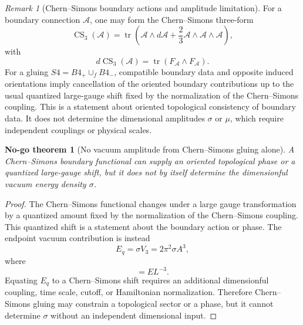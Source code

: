 \documentclass[11pt,a4paper]{article}
\def\Bfour{B4}%
\def\Sfour{S4}%
\def\dd{d}%
\numberwithin{equation}{section}
\newtheorem{nogotheorem}[criterion]{No-go theorem}
\theoremstyle{remark}
\newtheorem{remark}[criterion]{Remark}
\newcommand{\Sfour}{S^4}
\newcommand{\Bfour}{B^4}
\newcommand{\dd}{\mathrm{d}}
\begin{document}
\begin{remark}[Chern--Simons boundary actions and amplitude limitation]
For a boundary connection \(\mathcal{A}\), one may form the Chern--Simons three-form \cite{ChernSimons1974}
\begin{equation}
\operatorname{CS}_3(\mathcal{A})=
\operatorname{tr}\left(\mathcal{A}\wedge\dd\mathcal{A}
+\frac{2}{3}\mathcal{A}\wedge\mathcal{A}\wedge\mathcal{A}\right),
\end{equation}
with
\begin{equation}
\dd\operatorname{CS}_3(\mathcal{A})=\operatorname{tr}(F_{\mathcal{A}}\wedge F_{\mathcal{A}}).
\end{equation}
For a gluing \(\Sfour=\Bfour_+\cup_f\Bfour_-\), compatible boundary data and opposite induced orientations imply cancellation of the oriented boundary contributions up to the usual quantized large-gauge shift fixed by the normalization of the Chern--Simons coupling. This is a statement about oriented topological consistency of boundary data. It does not determine the dimensional amplitudes \(\sigma\) or \(\mu\), which require independent couplings or physical scales.
\end{remark}


\begin{nogotheorem}[No vacuum amplitude from Chern--Simons gluing alone]
A Chern--Simons boundary functional can supply an oriented topological phase or a quantized large-gauge shift, but it does not by itself determine the dimensionful vacuum energy density \(\sigma\).
\end{nogotheorem}
\begin{proof}
The Chern--Simons functional changes under a large gauge transformation by a quantized amount fixed by the normalization of the Chern--Simons coupling. This quantized shift is a statement about the boundary action or phase. The endpoint vacuum contribution is instead
\begin{equation}
E_q=\sigma V_3=2\pi^2\sigma A^3,
\end{equation}
where
\begin{equation}
[\sigma]=EL^{-3}.
\end{equation}
Equating \(E_q\) to a Chern--Simons shift requires an additional dimensionful coupling, time scale, cutoff, or Hamiltonian normalization. Therefore Chern--Simons gluing may constrain a topological sector or a phase, but it cannot determine \(\sigma\) without an independent dimensional input.
\end{proof}
\end{document}
